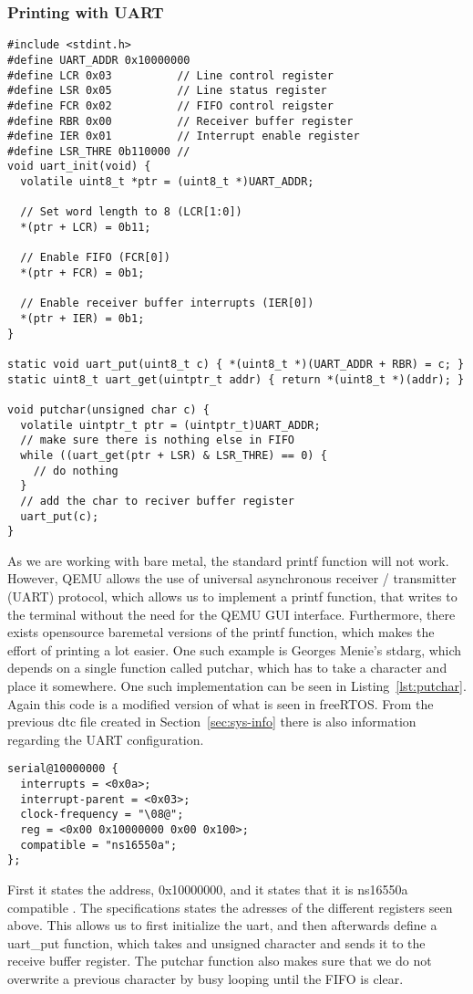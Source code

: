 \subsubsection{Printing with UART}
\begin{lstlisting}[float=*, label=lst:putchar, caption=Implementation of putchar of stdarg lib]
#include <stdint.h>
#define UART_ADDR 0x10000000
#define LCR 0x03          // Line control register
#define LSR 0x05          // Line status register
#define FCR 0x02          // FIFO control reigster
#define RBR 0x00          // Receiver buffer register
#define IER 0x01          // Interrupt enable register
#define LSR_THRE 0b110000 //
void uart_init(void) {
  volatile uint8_t *ptr = (uint8_t *)UART_ADDR;

  // Set word length to 8 (LCR[1:0])
  *(ptr + LCR) = 0b11;

  // Enable FIFO (FCR[0])
  *(ptr + FCR) = 0b1;

  // Enable receiver buffer interrupts (IER[0])
  *(ptr + IER) = 0b1;
}

static void uart_put(uint8_t c) { *(uint8_t *)(UART_ADDR + RBR) = c; }
static uint8_t uart_get(uintptr_t addr) { return *(uint8_t *)(addr); }

void putchar(unsigned char c) {
  volatile uintptr_t ptr = (uintptr_t)UART_ADDR;
  // make sure there is nothing else in FIFO
  while ((uart_get(ptr + LSR) & LSR_THRE) == 0) {
    // do nothing
  }
  // add the char to reciver buffer register
  uart_put(c);
}
\end{lstlisting}
As we are working with bare metal, the standard printf function will not work. However, QEMU
allows the use of universal asynchronous receiver / transmitter (UART) protocol, which allows
us to implement a printf function, that writes to the terminal without the need for the QEMU
GUI interface. Furthermore, there exists opensource baremetal versions of the printf function,
which makes the effort of printing a lot easier. One such example is Georges Menie's stdarg,
which depends on a single function called putchar, which has to take a character and place it
somewhere. One such implementation can be seen in Listing~\ref{lst:putchar}. Again this code is
a modified version of what is seen in freeRTOS. From the previous dtc file created
in Section~\ref{sec:sys-info} there is also information regarding the UART configuration.
\begin{lstlisting}
serial@10000000 {
  interrupts = <0x0a>;
  interrupt-parent = <0x03>;
  clock-frequency = "\08@";
  reg = <0x00 0x10000000 0x00 0x100>;
  compatible = "ns16550a";
};
\end{lstlisting}
First it states the address, 0x10000000, and it states that it is ns16550a compatible
\cite{uart}. The specifications states the adresses of the different registers seen above.
This allows us to first initialize the uart, and then afterwards define a uart\_put function,
which takes and unsigned character and sends it to the receive buffer register. The putchar
function also makes sure that we do not overwrite a previous character by busy looping until
the FIFO is clear.



